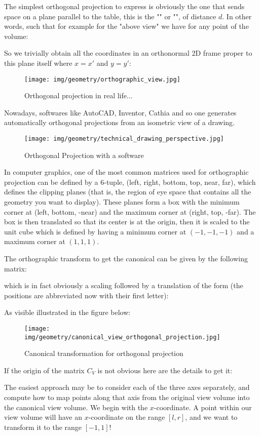 	The simplest orthogonal projection to express is obviously the one that sends space on a plane parallel to the table, this is the "" or "", of distance $d$. In other words, such that for example for the "above view" we have for any point of the volume:
	
	So we trivially obtain all the coordinates in an orthonormal 2D frame proper to this plane itself where $x=x'$ and $y=y'$:
	\begin{figure}[H]
		\centering
		\texttt{[image: img/geometry/orthographic\_view.jpg]}
		\caption{Orthogonal projection in real life...}
	\end{figure}
	Nowadays, softwares like AutoCAD, Inventor, Cathia and so one generates automatically orthogonal projections from an isometric view of a drawing.
	\begin{figure}[H]
		\centering
		\texttt{[image: img/geometry/technical\_drawing\_perspective.jpg]}
		\caption[]{Orthogonal Projection with a software}
	\end{figure}
	In computer graphics, one of the most common matrices used for orthographic projection can be defined by a $6$-tuple, (left, right, bottom, top, near, far), which defines the clipping planes (that is, the region of eye space that contains all the geometry you want to display). These planes form a box with the minimum corner at (left, bottom, -near) and the maximum corner at (right, top, -far). The box is then translated so that its center is at the origin, then it is scaled to the unit cube which is defined by having a minimum corner at $(-1,-1,-1)$ and a maximum corner at $(1,1,1)$.

	The orthographic transform to get the canonical can be given by the following matrix:
	
	which is in fact obviously a scaling followed by a translation of the form (the positions are abbreviated now with their first letter):
	
	As visible illustrated in the figure below:
	\begin{figure}[H]
		\centering
		\texttt{[image: img/geometry/canonical\_view\_orthogonal\_projection.jpg]}
		\caption[]{Canonical transformation for orthogonal projection}
	\end{figure}
	If the origin of the matrix $C_V$ is not obvious here are the details to get it:
	
	The easiest approach may be to consider each of the three axes separately, and compute how to map points along that axis from the original view volume into the canonical view volume. We begin with the $x$-coordinate. A point within our view volume will have an $x$-coordinate on the range $[l, r]$, and we want to transform it to the range $[-1, 1]$!

